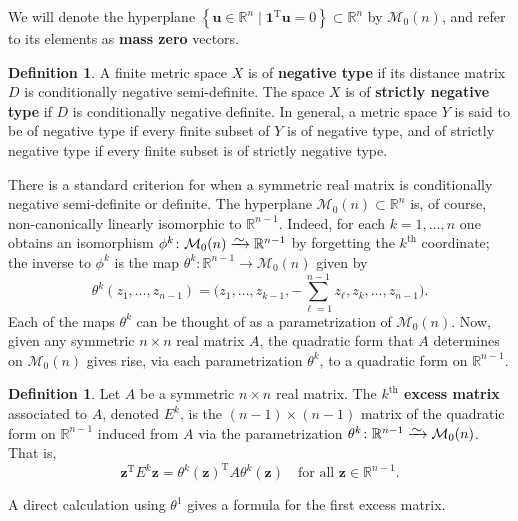 \documentclass[a4paper, oneside, reqno]{amsart}
\theoremstyle{definition}
\newtheorem{definition}[theorem]{Definition}
\theoremstyle{remark}
\numberwithin{equation}{section}
\renewcommand{\vec}{\mathbf}
\renewcommand{\th}{\text{th}}
\newcommand{\onevector}{\mathbf{1}}
\newcommand{\transpose}{\mathrm{T}}
\newcommand{\R}{\mathbb{R}}
\newcommand{\define}{\textbf}
\newcommand{\measmasszero}[1]{\mathcal{M}_0(#1)}
\newcommand{\isomto}{\xrightarrow{\raisebox{-0.5ex}[0ex][0ex]{$\sim$}}}
\begin{document}
We will denote the hyperplane \(\left\{ \vec{u} \in \R^{n} \mid \onevector^\transpose \vec{u} = 0\right\} \subset \R^n\) by \(\measmasszero{n}\), and refer to its elements as \define{mass zero} vectors.

\begin{definition}
\label{def:negative_type}
A finite metric space \(X\) is of \define{negative type} if its distance matrix \(D\) is conditionally negative semi-definite. The space \(X\) is of \define{strictly negative type} if \(D\) is conditionally negative definite. In general, a metric space \(Y\) is said to be of {negative type} if every finite subset of \(Y\) is of negative type, and of {strictly negative type} if every finite subset is of strictly negative type.
\end{definition}

There is a standard criterion for when a symmetric real matrix is conditionally negative semi-definite or definite. The hyperplane \(\measmasszero{n} \subset \mathbb{R}^n\) is, of course, non-canonically linearly isomorphic to \(\R^{n-1}\). Indeed, for each \(k = 1, \dots, n\) one obtains an isomorphism \(\phi^k \colon \measmasszero{n} \isomto \R^{n-1}\) by forgetting the \(k^\th\) coordinate; the inverse to \(\phi^k\) is the map \(\theta^k \colon \R^{n-1} \to \measmasszero{n}\) given by 
\[
    \theta^k(z_1, \dots, z_{n-1}) = 
    \bigl(z_1, \dots, z_{k-1}, -\textstyle\sum_{\ell =1}^{n-1} z_{\ell}, z_k, \dots, z_{n-1}\bigr).
\] 
Each of the maps \(\theta^k\) can be thought of as a parametrization of \(\measmasszero{n}\). Now, given any symmetric \(n \times n\) real matrix \(A\), the quadratic form that \(A\) determines on \(\measmasszero{n}\) gives rise, via each parametrization \(\theta^k\), to a quadratic form on \(\R^{n-1}\).

\begin{definition}
Let \(A\) be a symmetric \(n \times n\) real matrix. The \define{\(k^\th\) excess matrix} associated to \(A\), denoted \(E^k\), is the \((n-1) \times (n-1)\) matrix of the quadratic form on \(\R^{n-1}\) induced from \(A\) via the parametrization \(\theta^k \colon \R^{n-1} \isomto \measmasszero{n}\).  That is,
    \[
        \vec{z}^\transpose E^k \vec{z} = \theta^k(\vec{z})^\transpose A \theta^k(\vec{z}) 
        \quad
        \text{for all }
        \vec{z} \in \R^{n-1}.
    \]
\end{definition}

A direct calculation using $\theta^1$ gives a formula for the first excess matrix.
\end{document}
